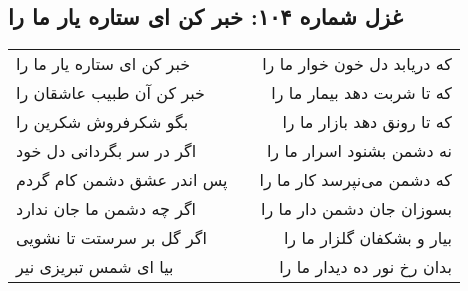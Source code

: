 \begin{center}
\section*{غزل شماره ۱۰۴: خبر کن ای ستاره یار ما را}
\label{sec:0104}
\begin{longtable}{l p{0.5cm} r}
خبر کن ای ستاره یار ما را
&&
که دریابد دل خون خوار ما را
\\
خبر کن آن طبیب عاشقان را
&&
که تا شربت دهد بیمار ما را
\\
بگو شکرفروش شکرین را
&&
که تا رونق دهد بازار ما را
\\
اگر در سر بگردانی دل خود
&&
نه دشمن بشنود اسرار ما را
\\
پس اندر عشق دشمن کام گردم
&&
که دشمن می‌نپرسد کار ما را
\\
اگر چه دشمن ما جان ندارد
&&
بسوزان جان دشمن دار ما را
\\
اگر گل بر سرستت تا نشویی
&&
بیار و بشکفان گلزار ما را
\\
بیا ای شمس تبریزی نیر
&&
بدان رخ نور ده دیدار ما را
\\
\end{longtable}
\end{center}
